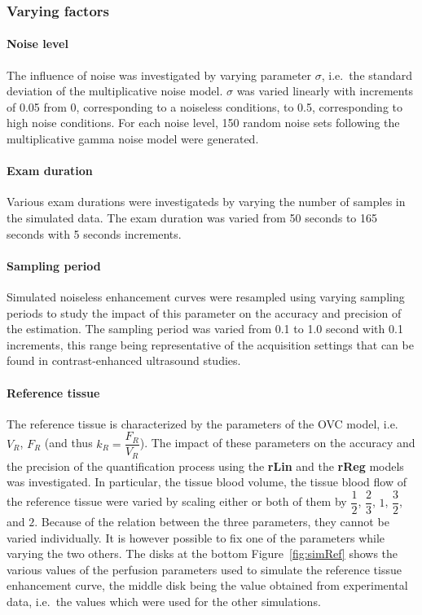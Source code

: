 \subsubsection{Varying factors}
\paragraph{Noise level}
The influence of noise was investigated by varying parameter $\sigma$, i.e.~the standard deviation of the multiplicative noise model.
$\sigma$ was varied linearly with increments of 0.05 from 0, corresponding to a noiseless conditions, to 0.5, corresponding to high noise conditions.
For each noise level, 150 random noise sets following the multiplicative gamma noise model were generated.

\paragraph{Exam duration}
Various exam durations were investigateds by varying the number of samples in the simulated data.
The exam duration was varied from 50 seconds to 165 seconds with 5 seconds increments.

\paragraph{Sampling period}
Simulated noiseless enhancement curves were resampled using varying sampling periods to study the impact of this parameter on the accuracy and precision of the estimation.
The sampling period was varied from 0.1 to 1.0 second with 0.1 increments, this range being representative of the acquisition settings that can be found in contrast-enhanced ultrasound studies.

\paragraph{Reference tissue}
The reference tissue is characterized by the parameters of the OVC model, i.e.~$V_R$, $F_R$ (and thus $k_R = \dfrac{F_R}{V_R}$).
The impact of these parameters on the accuracy and the precision of the quantification process using the \textbf{rLin} and the \textbf{rReg} models was investigated.
In particular, the tissue blood volume, the tissue blood flow of the reference tissue were varied by scaling either or both of them by $\dfrac{1}{2}$, $\dfrac{2}{3}$, $1$, $\dfrac{3}{2}$, and $2$.
Because of the relation between the three parameters, they cannot be varied individually.
It is however possible to fix one of the parameters while varying the two others.
The disks at the bottom Figure~\ref{fig:simRef} shows the various values of the perfusion parameters used to simulate the reference tissue enhancement curve, the middle disk being the value obtained from experimental data, i.e.~the values which were used for the other simulations.

